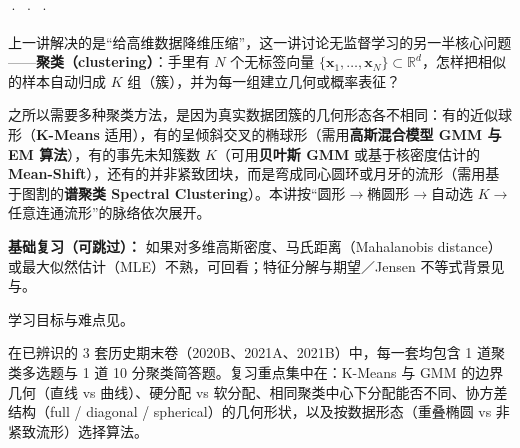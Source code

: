 



 ·  ·  · 

上一讲解决的是“给高维数据降维压缩”，这一讲讨论无监督学习的另一半核心问题——\textbf{聚类（clustering）}：手里有 $N$ 个无标签向量 $\{\mathbf{x}_1,\dots,\mathbf{x}_N\}\subset\mathbb{R}^d$，怎样把相似的样本自动归成 $K$ 组（簇），并为每一组建立几何或概率表征？

之所以需要多种聚类方法，是因为真实数据团簇的几何形态各不相同：有的近似球形（\textbf{K-Means} 适用），有的呈倾斜交叉的椭球形（需用\textbf{高斯混合模型 GMM 与 EM 算法}），有的事先未知簇数 $K$（可用\textbf{贝叶斯 GMM} 或基于核密度估计的 \textbf{Mean-Shift}），还有的并非紧致团块，而是弯成同心圆环或月牙的流形（需用基于图割的\textbf{谱聚类 Spectral Clustering}）。本讲按“圆形\ensuremath{\to}椭圆形\ensuremath{\to}自动选 $K$\ensuremath{\to}任意连通流形”的脉络依次展开。

\textbf{基础复习（可跳过）：} 如果对多维高斯密度、马氏距离（Mahalanobis distance）或最大似然估计（MLE）不熟，可回看；特征分解与期望／Jensen 不等式背景见与。

学习目标与难点见。



在已辨识的 3 套历史期末卷（2020B、2021A、2021B）中，每一套均包含 1 道聚类多选题与 1 道 10 分聚类简答题。复习重点集中在：K-Means 与 GMM 的边界几何（直线 vs 曲线）、硬分配 vs 软分配、相同聚类中心下分配能否不同、协方差结构（full / diagonal / spherical）的几何形状，以及按数据形态（重叠椭圆 vs 非紧致流形）选择算法。

